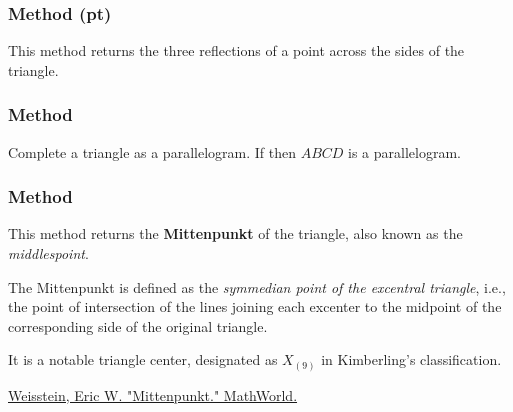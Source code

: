 \subsubsection{Method (pt)}
\label{ssub:method_triangle_reflections_pt}

This method returns the three reflections of a point across the sides of the triangle.

\begin{tkzexample}[latex = .5\textwidth]
\begin{center}
\end{center}
\end{tkzexample}



\subsubsection{Method }
\label{ssub:method_triangle_parallelogram}
Complete a triangle as a parallelogram. If  then  $ABCD$ is a parallelogram.

\subsubsection{Method } %
\label{ssub:method_triangle_mittenpunkt}

This method returns the \textbf{Mittenpunkt} of the triangle, also known as the \emph{middlespoint}.

\medskip

The Mittenpunkt is defined as the \emph{symmedian point of the excentral triangle}, i.e., the point of intersection of the lines joining each excenter to the midpoint of the corresponding side of the original triangle.

\medskip

It is a notable triangle center, designated as $X_{(9)}$ in Kimberling’s classification.
\begin{flushright}
\small
\href{https://mathworld.wolfram.com/Mittenpunkt.html}{Weisstein, Eric W. "Mittenpunkt." MathWorld.}
\end{flushright}

